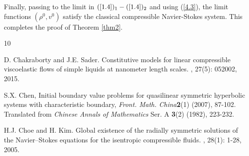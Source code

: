 \documentclass[10pt,reqno]{amsart}
\numberwithin{equation}{section}
\begin{document}
	
	Finally, passing to the limit in $(\ref{1.4})_1-(\ref{1.4})_2$ and using (\ref{4.3}), the limit functions \((\rho^0, v^0)\) satisfy the classical compressible Navier-Stokes system. This completes the proof of Theorem \ref{thm2}.
	
	
	
	
	
	\begin{thebibliography}{10}
		
		
		D. Chakraborty and J.E. Sader.
		\newblock Constitutive models for linear compressible viscoelastic flows of simple liquids at nanometer length scales.
		, 27(5): 052002, 2015.
		
 S.X. Chen, Initial boundary value problems for quasilinear symmetric hyperbolic systems with characteristic boundary, {\it Front. Math. China}{\bf 2}(1) (2007), 87-102. Translated from {\it 
Chinese Annals of Mathematics} Ser. A {\bf 3}(2) (1982), 223-232. 


		H.J. Choe and H. Kim. 
		\newblock Global existence of the radially symmetric solutions of the Navier–Stokes equations for the isentropic compressible fluids. 
		, 28(1): 1-28, 2005.
		
		
		
		

\end{thebibliography}
\end{document}
